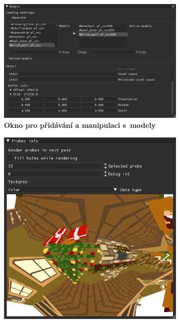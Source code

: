 \begin{figure}[H]
	\centering
	\captionsetup{justification=centering}
	\begin{subfigure}[t]{.49\textwidth}
		\centering
		\includegraphics[scale=1]{images/dp_ui_models.png}
		\caption{\textbf{Okno pro přidávání a manipulaci s~modely}}
		\label{fig:model_ui}
	\end{subfigure}
		\begin{subfigure}[t]{.49\textwidth}
		\centering
		\includegraphics[scale=1]{images/dp_ui_probes.png}

\end{subfigure}
\end{figure}
